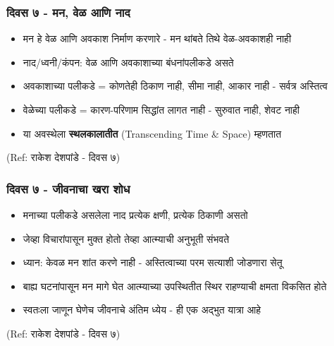 \begin{frame}[fragile]\frametitle{दिवस ७ - मन, वेळ आणि नाद}

	\begin{itemize}
	\item मन हे वेळ आणि अवकाश निर्माण करणारे - मन थांबते तिथे वेळ-अवकाशही नाही
	\item नाद/ध्वनी/कंपन: वेळ आणि अवकाशाच्या बंधनांपलीकडे असते
	\item अवकाशाच्या पलीकडे = कोणतेही ठिकाण नाही, सीमा नाही, आकार नाही - सर्वत्र अस्तित्व
	\item वेळेच्या पलीकडे = कारण-परिणाम सिद्धांत लागत नाही - सुरुवात नाही, शेवट नाही
	\item या अवस्थेला \textbf{स्थलकालातीत} (Transcending Time \& Space) म्हणतात
	\end{itemize}

{\tiny (Ref: राकेश देशपांडे - दिवस ७)}

\end{frame}

\begin{frame}[fragile]\frametitle{दिवस ७ - जीवनाचा खरा शोध}

	\begin{itemize}
	\item मनाच्या पलीकडे असलेला नाद प्रत्येक क्षणी, प्रत्येक ठिकाणी असतो
	\item जेव्हा विचारांपासून मुक्त होतो तेव्हा आत्म्याची अनुभूती संभवते
	\item ध्यान: केवळ मन शांत करणे नाही - अस्तित्वाच्या परम सत्याशी जोडणारा सेतू
	\item बाह्य घटनांपासून मन मागे घेत आत्म्याच्या उपस्थितीत स्थिर राहण्याची क्षमता विकसित होते
	\item स्वतःला जाणून घेणेच जीवनाचे अंतिम ध्येय - ही एक अद्भुत यात्रा आहे
	\end{itemize}

{\tiny (Ref: राकेश देशपांडे - दिवस ७)}

\end{frame}
